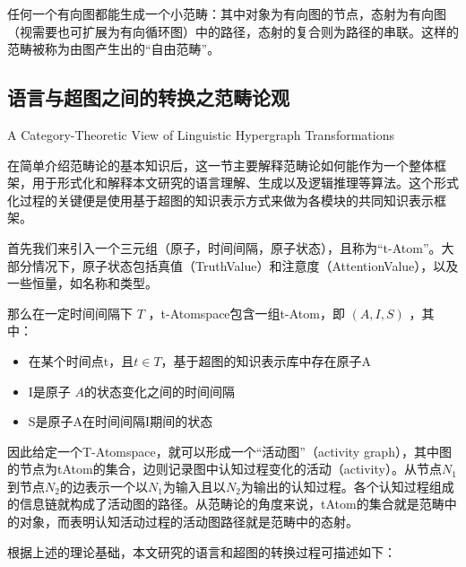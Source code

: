 任何一个有向图都能生成一个小范畴：其中对象为有向图的节点，态射为有向图（视需要也可扩展为有向循环图）中的路径，态射的复合则为路径的串联。这样的范畴被称为由图产生出的“自由范畴”。


\subsection{语言与超图之间的转换之范畴论观}{A Category-Theoretic View of Linguistic Hypergraph Transformations}

在简单介绍范畴论的基本知识后，这一节主要解释范畴论如何能作为一个整体框架，用于形式化和解释本文研究的语言理解、生成以及逻辑推理等算法。这个形式化过程的关键便是使用基于超图的知识表示方式来做为各模块的共同知识表示框架。

首先我们来引入一个三元组（原子，时间间隔，原子状态），且称为“t-Atom”。大部分情况下，原子状态包括真值（TruthValue）和注意度（AttentionValue），以及一些恒量，如名称和类型。

那么在一定时间间隔下 $T$ ，t-Atomspace包含一组t-Atom，即 $(A,I,S)$ ，其中：

\begin{itemize}
\item 在某个时间点t，且$t \in T$，基于超图的知识表示库中存在原子A
\item I是原子 $A$的状态变化之间的时间间隔
\item S是原子A在时间间隔I期间的状态
\end{itemize}

因此给定一个T-Atomspace，就可以形成一个“活动图”（activity graph），其中图的节点为tAtom的集合，边则记录图中认知过程变化的活动（activity）。从节点$N_1$ 到节点$N_2$的边表示一个以$N_1$为输入且以$N_2$为输出的认知过程。各个认知过程组成的信息链就构成了活动图的路径。从范畴论的角度来说，tAtom的集合就是范畴中的对象，而表明认知活动过程的活动图路径就是范畴中的态射。

根据上述的理论基础，本文研究的语言和超图的转换过程可描述如下：

